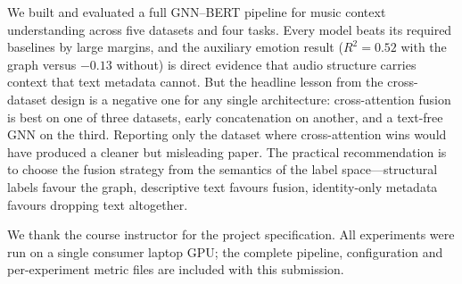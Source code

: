 \documentclass{article}
\begin{document}
We built and evaluated a full GNN--BERT pipeline for music context understanding
across five datasets and four tasks. Every model beats its required baselines by
large margins, and the auxiliary emotion result ($R^2 = 0.52$ with the graph
versus $-0.13$ without) is direct evidence that audio structure carries context
that text metadata cannot. But the headline lesson from the cross-dataset design
is a negative one for any single architecture: cross-attention fusion is best on
one of three datasets, early concatenation on another, and a text-free GNN on the
third. Reporting only the dataset where cross-attention wins would have produced a
cleaner but misleading paper. The practical recommendation is to choose the fusion
strategy from the semantics of the label space---structural labels favour the
graph, descriptive text favours fusion, identity-only metadata favours dropping
text altogether.

\begin{ack}
We thank the course instructor for the project specification. All experiments were
run on a single consumer laptop GPU; the complete pipeline, configuration and
per-experiment metric files are included with this submission.
\end{ack}
\end{document}
